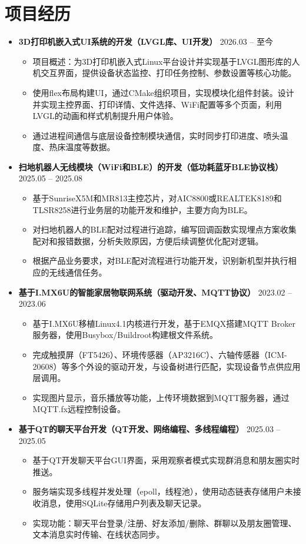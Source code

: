 \documentclass[11pt,a4paper]{article}
\begin{document}
	\section*{\textnormal{\textbf{项目经历}}}
	\begin{itemize}
		\item \textbf{3D打印机嵌入式UI系统的开发（LVGL库、UI开发）} \hfill 2026.03 -- 至今
		\begin{itemize}
			\item 项目概述：为3D打印机嵌入式Linux平台设计并实现基于LVGL图形库的人机交互界面，提供设备状态监控、打印任务控制、参数设置等核心功能。
			\item 使用flex布局构建UI，通过CMake组织项目，实现模块化组件封装。设计并实现主控界面、打印详情、文件选择、WiFi配置等多个页面，利用LVGL的动画和样式机制提升用户体验。
			\item 通过进程间通信与底层设备控制模块通信，实时同步打印进度、喷头温度、热床温度等数据。
		\end{itemize}
		
		\item \textbf{扫地机器人无线模块（WiFi和BLE）的开发（低功耗蓝牙BLE协议栈）} \hfill 2025.05 -- 2025.08
		\begin{itemize}
			\item 基于SunriseX5M和MR813主控芯片，对AIC8800或REALTEK8189和TLSR8258进行业务层的功能开发和维护，主要方向为BLE。
			\item 对扫地机器人的BLE配对过程进行追踪，编写回调函数实现埋点方案收集配对和报错数据，分析失败原因，方便后续调整优化配对逻辑。
			\item 根据产品业务要求，对BLE配对流程进行功能开发，识别新机型并执行相应的无线通信任务。
		\end{itemize}
	
		\item \textbf{基于I.MX6U的智能家居物联网系统（驱动开发、MQTT协议）} \hfill 2023.02 -- 2023.06
		\begin{itemize}
			\item 基于I.MX6U移植Linux4.1内核进行开发，基于EMQX搭建MQTT Broker服务器，使用Busybox/Buildroot构建根文件系统。
			\item 完成触摸屏（FT5426）、环境传感器（AP3216C）、六轴传感器（ICM-20608）等多个外设的驱动开发，与设备树进行匹配，实现设备节点供应用层调用。
			\item 实现图片显示，音乐播放等功能，上传环境数据到MQTT服务器，通过MQTT.fx远程控制设备。
		\end{itemize}
		
		\item \textbf{基于QT的聊天平台开发（QT开发、网络编程、多线程编程）} \hfill 2025.03 -- 2025.05
		\begin{itemize}
			\item 基于QT开发聊天平台GUI界面，采用观察者模式实现群消息和朋友圈实时推送。
			\item 服务端实现多线程并发处理（epoll，线程池），使用动态链表存储用户未接收消息，使用SQLite存储用户列表及聊天记录。
			\item 实现功能：聊天平台登录/注册、好友添加/删除、群聊以及朋友圈管理、文本消息实时传输、在线状态同步。
		\end{itemize}
		
	\end{itemize}
\end{document}
